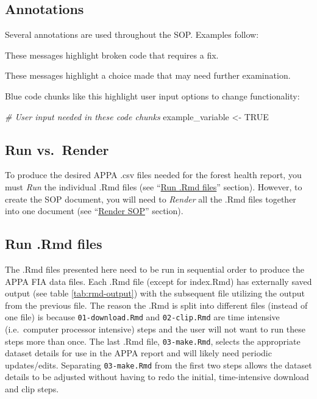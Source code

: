 \documentclass[
]{book}
\newenvironment{Shaded}{\begin{snugshade}}{\end{snugshade}}
\newcommand{\CommentTok}[1]{\textcolor[rgb]{0.56,0.35,0.01}{\textit{#1}}}
\newcommand{\ConstantTok}[1]{\textcolor[rgb]{0.56,0.35,0.01}{#1}}
\newcommand{\NormalTok}[1]{#1}
\newcommand{\OtherTok}[1]{\textcolor[rgb]{0.56,0.35,0.01}{#1}}
\begin{document}
\hypertarget{annotations}{%
\subsection{Annotations}\label{annotations}}

Several annotations are used throughout the SOP. Examples follow:

These messages highlight broken code that requires a fix.

These messages highlight a choice made that may need further examination.

Blue code chunks like this highlight user input options to change functionality:

\begin{Shaded}
\begin{Highlighting}[]
\CommentTok{\# User input needed in these code chunks}
\NormalTok{example\_variable }\OtherTok{\textless{}{-}} \ConstantTok{TRUE}
\end{Highlighting}
\end{Shaded}

\hypertarget{run-vs.-render}{%
\subsection{Run vs.~Render}\label{run-vs.-render}}

To produce the desired APPA .csv files needed for the forest health report, you must \emph{Run} the individual .Rmd files (see ``\protect\hyperlink{run}{Run .Rmd files}'' section). However, to create the SOP document, you will need to \emph{Render} all the .Rmd files together into one document (see ``\protect\hyperlink{render}{Render SOP}'' section).

\hypertarget{run}{%
\subsection{Run .Rmd files}\label{run}}

The .Rmd files presented here need to be run in sequential order to produce the APPA FIA data files. Each .Rmd file (except for index.Rmd) has externally saved output (see table \ref{tab:rmd-output}) with the subsequent file utilizing the output from the previous file. The reason the .Rmd is split into different files (instead of one file) is because \texttt{01-download.Rmd} and \texttt{02-clip.Rmd} are time intensive (i.e.~computer processor intensive) steps and the user will not want to run these steps more than once. The last .Rmd file, \texttt{03-make.Rmd}, selects the appropriate dataset details for use in the APPA report and will likely need periodic updates/edits. Separating \texttt{03-make.Rmd} from the first two steps allows the dataset details to be adjusted without having to redo the initial, time-intensive download and clip steps.
\end{document}
